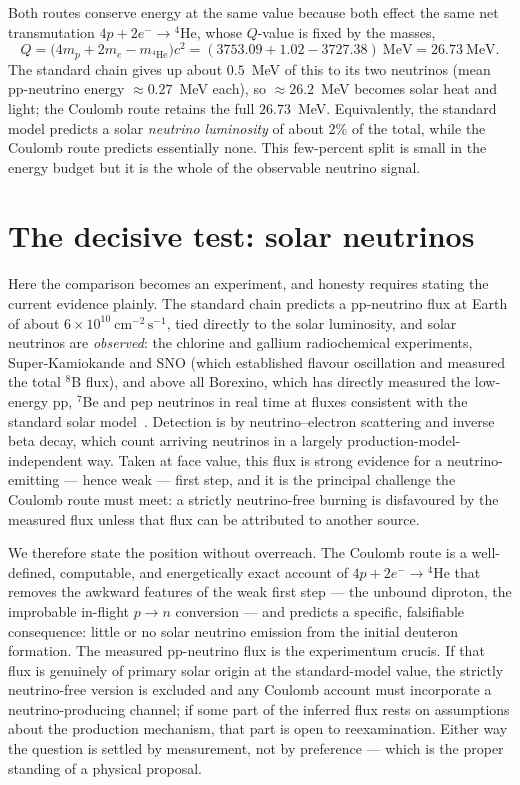 \documentclass[11pt]{article}
\begin{document}
Both routes conserve energy at the same value because both effect the same net transmutation
$4p+2e^-\to{}^4\mathrm{He}$, whose $Q$-value is fixed by the masses,
\begin{equation}
Q = \big(4m_p + 2m_e - m_{^4\mathrm{He}}\big)c^2
  = (3753.09 + 1.02 - 3727.38)~\text{MeV} = 26.73~\text{MeV}.
\end{equation}
The standard chain gives up about $0.5$~MeV of this to its two neutrinos (mean pp-neutrino energy
$\approx 0.27$~MeV each), so $\approx 26.2$~MeV becomes solar heat and light; the Coulomb route retains
the full $26.73$~MeV. Equivalently, the standard model predicts a solar \emph{neutrino luminosity} of
about $2\%$ of the total, while the Coulomb route predicts essentially none. This few-percent split is
small in the energy budget but it is the whole of the observable neutrino signal.

\section{The decisive test: solar neutrinos}
\label{sec:test}

Here the comparison becomes an experiment, and honesty requires stating the current evidence plainly.
The standard chain predicts a pp-neutrino flux at Earth of about
$6\times10^{10}~\mathrm{cm^{-2}\,s^{-1}}$, tied directly to the solar luminosity, and solar neutrinos
are \emph{observed}: the chlorine and gallium radiochemical experiments, Super-Kamiokande and SNO
(which established flavour oscillation and measured the total ${}^8$B flux), and above all Borexino,
which has directly measured the low-energy pp, ${}^7$Be and pep neutrinos in real time at fluxes
consistent with the standard solar model~\cite{Borexino,SNO,Adelberger}. Detection is by
neutrino--electron scattering and inverse beta decay, which count arriving neutrinos in a largely
production-model-independent way. Taken at face value, this flux is strong evidence for a
neutrino-emitting --- hence weak --- first step, and it is the principal challenge the Coulomb route
must meet: a strictly neutrino-free burning is disfavoured by the measured flux unless that flux can be
attributed to another source.

We therefore state the position without overreach. The Coulomb route is a well-defined, computable, and
energetically exact account of $4p+2e^-\to{}^4\mathrm{He}$ that removes the awkward features of the
weak first step --- the unbound diproton, the improbable in-flight $p\to n$ conversion --- and predicts
a specific, falsifiable consequence: little or no solar neutrino emission from the initial deuteron
formation. The measured pp-neutrino flux is the experimentum crucis. If that flux is genuinely of
primary solar origin at the standard-model value, the strictly neutrino-free version is excluded and
any Coulomb account must incorporate a neutrino-producing channel; if some part of the inferred flux
rests on assumptions about the production mechanism, that part is open to reexamination. Either way the
question is settled by measurement, not by preference --- which is the proper standing of a physical
proposal.
\end{document}
